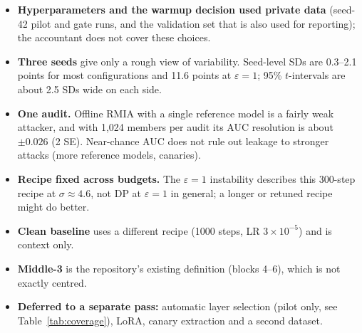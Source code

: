 \documentclass[11pt,a4paper]{article}
\begin{document}
\begin{itemize}
  \item \textbf{Hyperparameters and the warmup decision used private data} (seed-42 pilot and gate runs, and the
        validation set that is also used for reporting); the accountant does not cover these choices.
  \item \textbf{Three seeds} give only a rough view of variability. Seed-level SDs are 0.3--2.1 points for most
        configurations and 11.6 points at $\varepsilon = 1$; 95\% $t$-intervals are about 2.5 SDs wide on each side.
  \item \textbf{One audit.} Offline RMIA with a single reference model is a fairly weak attacker, and with 1{,}024
        members per audit its AUC resolution is about $\pm 0.026$ (2 SE). Near-chance AUC does not rule out leakage
        to stronger attacks (more reference models, canaries).
  \item \textbf{Recipe fixed across budgets.} The $\varepsilon = 1$ instability describes this 300-step recipe at
        $\sigma \approx 4.6$, not DP at $\varepsilon = 1$ in general; a longer or retuned recipe might do better.
  \item \textbf{Clean baseline} uses a different recipe (1000 steps, LR $3\times10^{-5}$) and is context only.
  \item \textbf{Middle-3} is the repository's existing definition (blocks 4--6), which is not exactly centred.
  \item \textbf{Deferred to a separate pass:} automatic layer selection (pilot only, see Table~\ref{tab:coverage}),
        LoRA, canary extraction and a second dataset.
\end{itemize}
\end{document}
